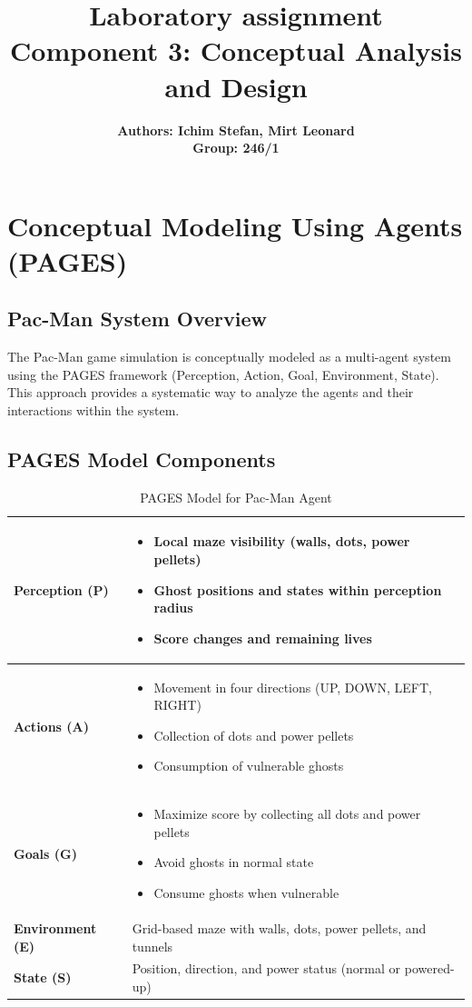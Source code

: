 \documentclass[a4paper, 11pt]{article}
\title{\textbf{Laboratory assignment} \\[1ex] \large \textbf{Component 3: Conceptual Analysis and Design}}
\author{\textbf{Authors: Ichim Stefan, Mirt Leonard} \\ \textbf{Group: 246/1}}
\begin{document}
\maketitle

\section{Conceptual Modeling Using Agents (PAGES)}

\subsection{Pac-Man System Overview}
The Pac-Man game simulation is conceptually modeled as a multi-agent system using the PAGES framework (Perception, Action, Goal, Environment, State). This approach provides a systematic way to analyze the agents and their interactions within the system.

\subsection{PAGES Model Components}

\begin{table}[h]
\centering
\caption{PAGES Model for Pac-Man Agent}
\begin{tabular}{|p{2.5cm}|p{11cm}|}
\hline
\textbf{Perception (P)} & 
\begin{itemize}
    \item Local maze visibility (walls, dots, power pellets)
    \item Ghost positions and states within perception radius
    \item Score changes and remaining lives
\end{itemize} \\
\hline
\textbf{Actions (A)} & 
\begin{itemize}
    \item Movement in four directions (UP, DOWN, LEFT, RIGHT)
    \item Collection of dots and power pellets
    \item Consumption of vulnerable ghosts
\end{itemize} \\
\hline
\textbf{Goals (G)} & 
\begin{itemize}
    \item Maximize score by collecting all dots and power pellets
    \item Avoid ghosts in normal state
    \item Consume ghosts when vulnerable
\end{itemize} \\
\hline
\textbf{Environment (E)} & Grid-based maze with walls, dots, power pellets, and tunnels \\
\hline
\textbf{State (S)} & Position, direction, and power status (normal or powered-up) \\
\hline
\end{tabular}
\end{table}
\end{document}
